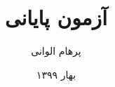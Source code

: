 \documentclass[paper=a4, fontsize=11pt]{article}
\title{آزمون پایانی}
\author{پرهام الوانی}
\date{بهار ۱۳۹۹}
\begin{document}
    \maketitle

    
    \pagebreak
    
    \pagebreak
    
    \pagebreak
    
\end{document}

